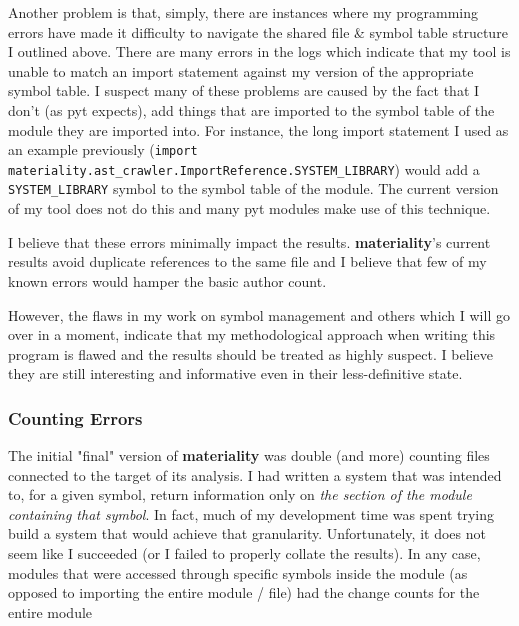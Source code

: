 \documentclass[a4paper,man,natbib,floatsintext]{apa6}
\begin{document}

  Another problem is that, simply, there are instances where my programming errors have made it difficulty to navigate the shared file \& symbol table structure I outlined above. There are many errors in the logs which indicate that my tool is unable to match an import statement against my version of the appropriate symbol table. I suspect many of these problems are caused by the fact that I don't (as \Gls{pyt} expects), add things that are imported to the symbol table of the module they are imported into. For instance, the long import statement I used as an example previously (\verb|import materiality.ast_crawler.ImportReference.SYSTEM_LIBRARY|) would add a \verb|SYSTEM_LIBRARY| symbol to the symbol table of the module. The current version of my tool does not do this and many \Gls{pyt} modules make use of this technique.

  I believe that these errors minimally impact the results. \textbf{materiality}'s current results avoid duplicate references to the same file and I believe that few of my known errors would hamper the basic author count. 

  However, the flaws in my work on symbol management and others which I will go over in a moment, indicate that my methodological approach when writing this program is flawed and the results should be treated as highly suspect. I believe they are still interesting and informative even in their less-definitive state. 

  \subsubsection{Counting Errors}
  The initial "final" version of \textbf{materiality} was double (and more) counting files connected to the target of its analysis. I had written a system that was intended to, for a given symbol, return information only on \textit{the section of the module containing that symbol}. In fact, much of my development time was spent trying build a system that would achieve that granularity. Unfortunately, it does not seem like I succeeded (or I failed to properly collate the results). In any case, modules that were accessed through specific symbols inside the module (as opposed to importing the entire module / file) had the change counts for the entire module
\end{document}

